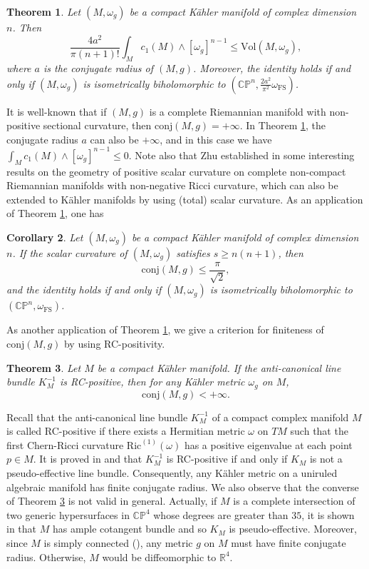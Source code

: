\documentclass[12pt]{amsart}
\theoremstyle{plain}
\newtheorem{thm}{Theorem}[section]
\newtheorem{cor}[thm]{Corollary}
\theoremstyle{definition}
\newcommand{\btheorem}{\begin{thm}}
\newcommand{\etheorem}{\end{thm}}
\newcommand{\bcorollary}{\begin{cor}}
\newcommand{\ecorollary}{\end{cor}}
\newcommand{\beq}{\begin{equation}}
\newcommand{\eeq}{\end{equation}}
\renewcommand{\>}{\rightarrow}
\newcommand{\C}{{\mathbb C}}
\renewcommand{\P}{{\mathbb P}}
\newcommand{\R}{{\mathbb R}}
\numberwithin{equation}{section} %
\begin{document}
	\btheorem\label{main1}
	Let $(M,\omega_g)$ be a compact K\"ahler manifold  of complex dimension $n$. Then 
	\beq 
	\frac{4a^2}{\pi (n+1)!}\int_M c_1(M)\wedge [\omega_g]^{n-1} \le \mathrm{Vol}(M,\omega_g),\label{formula key conclusion}
	\eeq 
	where $a$ is the conjugate radius of $(M,g)$.  Moreover, the identity holds if and only if $(M,\omega_g)$ is isometrically biholomorphic to $\left(\C\P^n,\frac{2a^2}{\pi^2}\omega_{\mathrm{FS}}\right)$.
	\etheorem	
	\noindent It is well-known that if $(M,g)$ is a complete Riemannian manifold with non-positive sectional curvature, then $\mathrm{conj}(M,g)=+\infty$.  
	In Theorem \ref{main1}, the conjugate radius $a$ can also be $+\infty$, and in this case we have $\int_M c_1(M)\wedge [\omega_g]^{n-1} \leq 0$. 
	Note also that Zhu established in \cite{Zhu22} some interesting results on the geometry of positive scalar curvature on complete non-compact Riemannian manifolds with non-negative Ricci curvature, 
		which can also be extended to K\"ahler manifolds by using (total) scalar curvature.
	As an application of Theorem \ref{main1}, one has 
	\bcorollary \label{main2}
	Let $(M,\omega_g)$ be a compact K\"ahler manifold of complex dimension $n$.
	If the scalar curvature of $(M,\omega_g)$  satisfies $s\ge n(n+1)$, then 
	\beq  \mathrm{conj}(M,g)\le \frac{\pi}{\sqrt{2}},\eeq
	and the identity holds if and only if $(M,\omega_g)$ is isometrically biholomorphic to $(\C\P^n,\omega_{\mathrm{FS}})$.
	\ecorollary	
	
	\noindent 
	As another application of Theorem \ref{main1}, we give a criterion for finiteness of $\mathrm{conj}(M,g)$ by using RC-positivity.
		
	\btheorem  \label{main3}
	Let $M$ be a compact K\"ahler manifold. 
	If the anti-canonical line bundle $K_M^{-1}$ is RC-positive,
	then for any K\"ahler metric $\omega_g$ on $M$,  $$\mathrm{conj}(M,g)<+\infty.$$
	\etheorem 

	\noindent Recall that the anti-canonical line bundle $K^{-1}_M$ of a compact complex manifold $M$ is called RC-positive 
		if there exists a Hermitian metric $\omega$ on $TM$ such that the first Chern-Ricci curvature $\mathrm{Ric}^{(1)}(\omega)$ has a positive eigenvalue at each point $p\in M$. 
	It is proved in \cite{Yan19a} and \cite{Yan19b} that $K_M^{-1}$ is RC-positive if and only if $K_M$ is not a pseudo-effective line bundle. 
	Consequently, any K\"ahler metric on a uniruled algebraic manifold has finite conjugate radius. 
	We also observe that the converse of Theorem \ref{main3} is not valid in general. 
	Actually, if $M$ is a complete intersection of two generic hypersurfaces in $\C\P^4$ whose degrees are greater than $35$, 
	it is shown in \cite[Corollary~4.13]{Bro14} that $M$ has ample cotangent bundle and so $K_M$ is pseudo-effective.
	Moreover, since $M$ is simply connected (\cite[pp.~221--222]{Sha13}), any metric $g$ on $M$ must have finite conjugate radius. 
	Otherwise, $M$ would be diffeomorphic to $\R^4$.\\
\end{document}
